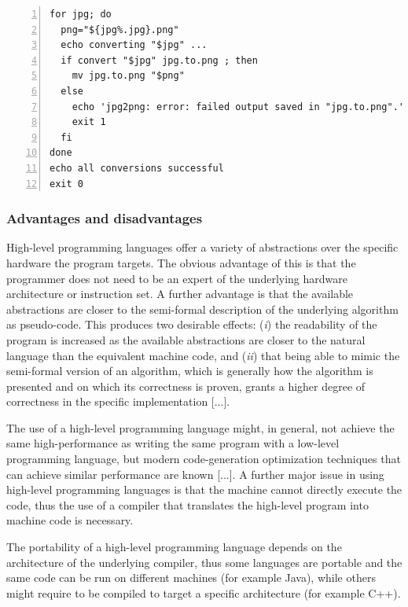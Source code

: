 \begin{lstlisting}[numbers = left, caption = Unix shell code, label = lst:ch1_shell_code]
for jpg; do                                  
  png="${jpg%.jpg}.png"                    
  echo converting "$jpg" ...               
  if convert "$jpg" jpg.to.png ; then      
    mv jpg.to.png "$png"                 
  else                                     
    echo 'jpg2png: error: failed output saved in "jpg.to.png".' >&2
    exit 1
  fi                                       
done                                         
echo all conversions successful              
exit 0
\end{lstlisting}

\subsubsection*{Advantages and disadvantages}
High-level programming languages offer a variety of abstractions over the specific hardware the program targets. The obvious advantage of this is that the programmer does not need to be an expert of the underlying hardware architecture or instruction set. A further advantage is that the available abstractions are closer to the semi-formal description of the underlying algorithm as pseudo-code. This produces two desirable effects: (\textit{i}) the readability of the program is increased as the available abstractions are closer to the natural language than the equivalent machine code, and (\textit{ii}) that being able to mimic the semi-formal version of an algorithm, which is generally how the algorithm is presented and on which its correctness is proven, grants a higher degree of correctness in the specific implementation [...].

The use of a high-level programming language might, in general, not achieve the same high-performance as writing the same program with a low-level programming language, but modern code-generation optimization techniques that can achieve similar performance are known [...]. A further major issue in using high-level programming languages is that the machine cannot directly execute the code, thus the use of a compiler that translates the high-level program into machine code is necessary.

The portability of a high-level programming language depends on the architecture of the underlying compiler, thus some languages are portable and the same code can be run on different machines (for example Java), while others might require to be compiled to target a specific architecture (for example C++).

